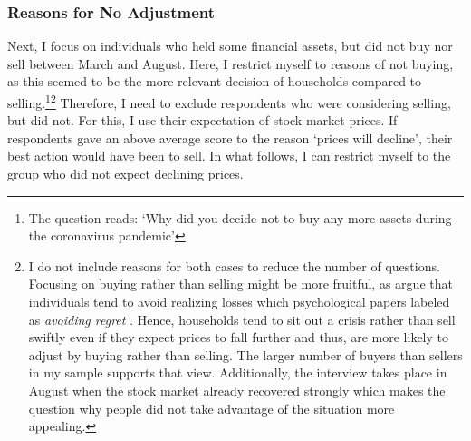 \documentclass[ProjectABM]{subfiles}
\begin{document}
\subsubsection{Reasons for No Adjustment}
Next, I focus on individuals who held some financial assets, but did not buy nor sell between March and August. Here, I restrict myself to reasons of not buying, as this seemed to be the more relevant decision of households compared to selling.\footnote{The question reads: `Why did you decide not to buy any more assets during the coronavirus pandemic'}\footnote{I do not include reasons for both cases to reduce the number of questions. Focusing on buying rather than selling might be more fruitful, as \cite{Kahneman_Tversky1979_Prospect} argue that individuals tend to avoid realizing losses which psychological papers labeled as \textit{avoiding regret} \citep{anderson2003_psychology}. Hence, households tend to sit out a crisis rather than sell swiftly even if they expect prices to fall further and thus, are more likely to adjust by buying rather than selling. The larger number of buyers than sellers in my sample supports that view. Additionally, the interview takes place in August when the stock market already recovered strongly which makes the question why people did not take advantage of the situation more appealing.} 
Therefore, I need to exclude respondents who were considering selling, but did not. For this, I use their expectation of stock market prices. If respondents gave an above average score to the reason `prices will decline', their best action would have been to sell. In what follows, I can restrict myself to the group who did not expect declining prices. 


%
\end{document}

